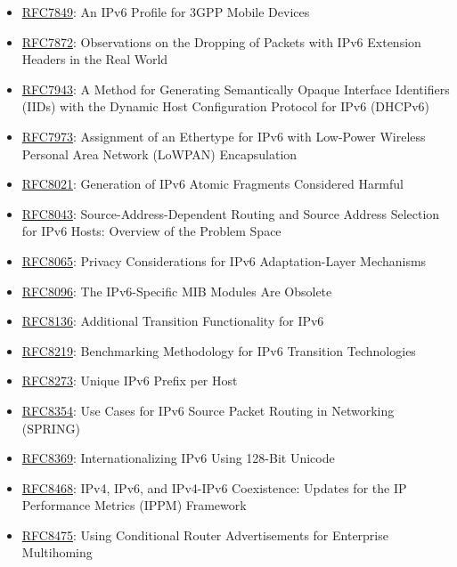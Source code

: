 \documentclass[
]{article}
\begin{document}
\begin{itemize}
\item
  \href{https://www.rfc-editor.org/info/rfc7849}{RFC7849}: An IPv6
  Profile for 3GPP Mobile Devices
\item
  \href{https://www.rfc-editor.org/info/rfc7872}{RFC7872}: Observations
  on the Dropping of Packets with IPv6 Extension Headers in the Real
  World
\item
  \href{https://www.rfc-editor.org/info/rfc7943}{RFC7943}: A Method for
  Generating Semantically Opaque Interface Identifiers (IIDs) with the
  Dynamic Host Configuration Protocol for IPv6 (DHCPv6)
\item
  \href{https://www.rfc-editor.org/info/rfc7973}{RFC7973}: Assignment of
  an Ethertype for IPv6 with Low-Power Wireless Personal Area Network
  (LoWPAN) Encapsulation
\item
  \href{https://www.rfc-editor.org/info/rfc8021}{RFC8021}: Generation of
  IPv6 Atomic Fragments Considered Harmful
\item
  \href{https://www.rfc-editor.org/info/rfc8043}{RFC8043}:
  Source-Address-Dependent Routing and Source Address Selection for IPv6
  Hosts: Overview of the Problem Space
\item
  \href{https://www.rfc-editor.org/info/rfc8065}{RFC8065}: Privacy
  Considerations for IPv6 Adaptation-Layer Mechanisms
\item
  \href{https://www.rfc-editor.org/info/rfc8096}{RFC8096}: The
  IPv6-Specific MIB Modules Are Obsolete
\item
  \href{https://www.rfc-editor.org/info/rfc8136}{RFC8136}: Additional
  Transition Functionality for IPv6
\item
  \href{https://www.rfc-editor.org/info/rfc8219}{RFC8219}: Benchmarking
  Methodology for IPv6 Transition Technologies
\item
  \href{https://www.rfc-editor.org/info/rfc8273}{RFC8273}: Unique IPv6
  Prefix per Host
\item
  \href{https://www.rfc-editor.org/info/rfc8354}{RFC8354}: Use Cases for
  IPv6 Source Packet Routing in Networking (SPRING)
\item
  \href{https://www.rfc-editor.org/info/rfc8369}{RFC8369}:
  Internationalizing IPv6 Using 128-Bit Unicode
\item
  \href{https://www.rfc-editor.org/info/rfc8468}{RFC8468}: IPv4, IPv6,
  and IPv4-IPv6 Coexistence: Updates for the IP Performance Metrics
  (IPPM) Framework
\item
  \href{https://www.rfc-editor.org/info/rfc8475}{RFC8475}: Using
  Conditional Router Advertisements for Enterprise Multihoming

\end{itemize}
\end{document}
